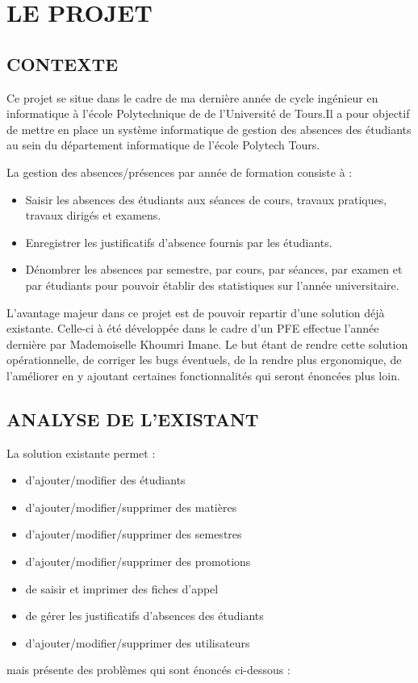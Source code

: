 \documentclass[overfullbox]{polytech/polytech}
\begin{document}
\chapter{LE PROJET}
\section{CONTEXTE}
Ce projet se situe dans le cadre de ma dernière année de cycle ingénieur en informatique à l'école Polytechnique de de l'Université de Tours.Il a pour objectif de mettre en place un système informatique de gestion des absences des étudiants au sein du département informatique de l'école Polytech Tours.

La gestion des absences/présences par année de formation consiste à : 
 \begin{itemize}
	\item Saisir les absences des étudiants aux séances de cours, travaux pratiques, travaux dirigés et examens.
    \item Enregistrer les justificatifs d'absence fournis par les étudiants.
  \item Dénombrer les absences par semestre, par cours, par séances, par examen et par étudiants pour pouvoir établir des statistiques sur l’année universitaire.
  \newline
 \end{itemize}
 
L’avantage majeur dans ce projet est de pouvoir repartir d’une solution déjà existante. Celle-ci à été développée dans le cadre d'un PFE effectue l'année dernière par Mademoiselle Khoumri Imane. Le but étant de rendre cette solution opérationnelle, de corriger les bugs éventuels, de la rendre plus ergonomique, de l'améliorer en y ajoutant certaines fonctionnalités qui seront énoncées plus loin.

\section{ANALYSE DE L'EXISTANT}
La solution existante permet : 
\begin{itemize}
	\item d'ajouter/modifier des étudiants
    \item d'ajouter/modifier/supprimer des matières
    \item d'ajouter/modifier/supprimer des semestres
    \item d'ajouter/modifier/supprimer des promotions
    \item de saisir et imprimer des fiches d'appel
    \item de gérer les justificatifs d'absences des étudiants
    \item d'ajouter/modifier/supprimer des utilisateurs
    \newline
\end{itemize}
mais présente des problèmes qui sont énoncés ci-dessous :
\end{document}
